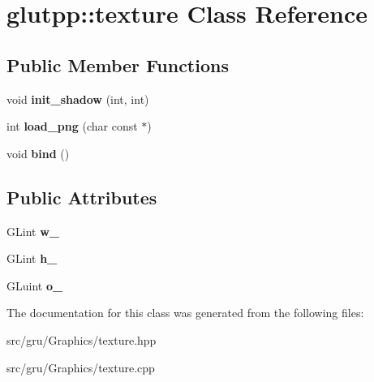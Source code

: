 \hypertarget{classglutpp_1_1texture}{\section{glutpp\-:\-:texture \-Class \-Reference}
\label{classglutpp_1_1texture}
}
\subsection*{\-Public \-Member \-Functions}
\begin{DoxyCompactItemize}
\item 
\hypertarget{classglutpp_1_1texture_a54de9aed503f8a506c4f075704e57342}{void {\bfseries init\-\_\-shadow} (int, int)}\label{classglutpp_1_1texture_a54de9aed503f8a506c4f075704e57342}

\item 
\hypertarget{classglutpp_1_1texture_aa41352eec52619c4f28829984f425e35}{int {\bfseries load\-\_\-png} (char const $\ast$)}\label{classglutpp_1_1texture_aa41352eec52619c4f28829984f425e35}

\item 
\hypertarget{classglutpp_1_1texture_a3854975201918ef4a98a87410c8721f3}{void {\bfseries bind} ()}\label{classglutpp_1_1texture_a3854975201918ef4a98a87410c8721f3}

\end{DoxyCompactItemize}
\subsection*{\-Public \-Attributes}
\begin{DoxyCompactItemize}
\item 
\hypertarget{classglutpp_1_1texture_a351a5f3dca555da7f15db2ea1a5c079b}{\-G\-Lint {\bfseries w\-\_\-}}\label{classglutpp_1_1texture_a351a5f3dca555da7f15db2ea1a5c079b}

\item 
\hypertarget{classglutpp_1_1texture_ab3bfa2904ae0ada7ae88d4493e1fc2fe}{\-G\-Lint {\bfseries h\-\_\-}}\label{classglutpp_1_1texture_ab3bfa2904ae0ada7ae88d4493e1fc2fe}

\item 
\hypertarget{classglutpp_1_1texture_a501fc15c4497264dcb92e5ee21b94837}{\-G\-Luint {\bfseries o\-\_\-}}\label{classglutpp_1_1texture_a501fc15c4497264dcb92e5ee21b94837}

\end{DoxyCompactItemize}


\-The documentation for this class was generated from the following files\-:\begin{DoxyCompactItemize}
\item 
src/gru/\-Graphics/texture.\-hpp\item 
src/gru/\-Graphics/texture.\-cpp\end{DoxyCompactItemize}
